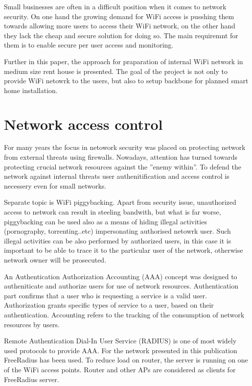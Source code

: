 \documentclass{llncs}
\begin{document}
Small businesses are often in a difficult position when it comes to network
security. On one hand the growing demand for WiFi access is pusshing them
towards allowing more users to access their WiFi network, on the other hand they
lack the cheap and secure solution for doing so. The main requiremnt for them is
to enable secure per user access and monitoring. 

Further in this paper, the approach for praparation of internal WiFi network in
medium size rent house is presented. The goal of the project is not only to
provide WiFi netowrk to the users, but also to setup backbone for planned
smart home installation.

\section{Network access control}
For many years the focus in netowork security was placed on protecting
network from external threats using firewalls. Nowadays, attention has turned
towards protecting crucial network resources against the ''enemy within''. To
defend the network against internal threats user authenitification and
access control is necessery even for small networks. 

Separate topic is WiFi piggybacking. Apart from security issue,
unauthorized access to network can result in steeling bandwith, but what is far
worse, piggybacking can be used also as a means of hiding illegal activities
(pornography, torrenting..etc) impersonating authorised netowrk user. Such
illegal activities can be also performed by authorized users, in this case it is
important to be able to trace it to the particular user of the network,
otherwise network owner will be prosecuted. 

An Authentication Authorization Accounting (AAA) \cite{rfc2903}\cite{rfc2904}
concept was designed to autheniticate and authorize users for use of network
resources. Authentication part confirms that a user who is requesting a service
is a valid user. Authorization grants specific types of service to a user, based
on their authentication. Accounting refers to the tracking of the consumption of
network resources by users.

Remote Authentication Dial-In User Service (RADIUS) \cite{rfc2865} is one of
most widely used protocols to provide AAA. For the network presented in this
publication FreeRadius \cite{freeRadius} has been used. To reduce load on
router, the server is running on one of the WiFi access points. Router and other
APs are considered as clients for FreeRadius server.
\end{document}
